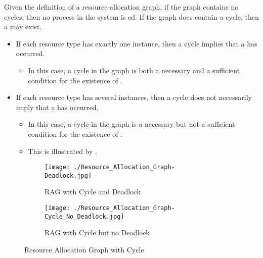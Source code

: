Given the definition of a resource-allocation graph, if the graph contains no cycles, then no process in the system is ed.
If the graph does contain a cycle, then a  may exist.
\begin{itemize}[noitemsep]
\item If each resource type has exactly one instance, then a cycle implies that a  has occurred.
  \begin{itemize}[noitemsep]
  \item In this case, a cycle in the graph is both a necessary and a sufficient condition for the existence of .
  \end{itemize}
\item If each resource type has several instances, then a cycle does not necessarily imply that a  has occurred.
  \begin{itemize}[noitemsep]
  \item In this case, a cycle in the graph is a necessary but not a sufficient condition for the existence of .
  \item This is illustrated by .
  \end{itemize}
\end{itemize}

\begin{figure}[h!tbp]
  \centering
  \begin{subfigure}[h!tbp]{0.48\linewidth}
    \centering
    \texttt{[image: ./Resource\_Allocation\_Graph-Deadlock.jpg]}
    \caption{RAG with Cycle and Deadlock}
    \label{subfig:Resource_Allocation_Graph-Cycle_Deadlock}
  \end{subfigure}
  \begin{subfigure}[h!tbp]{0.48\linewidth}
    \centering
    \texttt{[image: ./Resource\_Allocation\_Graph-Cycle\_No\_Deadlock.jpg]}
    \caption{RAG with Cycle but no Deadlock}
    \label{subfig:Resource_Allocation_Graph-Cycle_No_Deadlock}
  \end{subfigure}
  \caption{Resource Allocation Graph with Cycle}
  \label{fig:Resource_Allocation_Graph-Cycle}
\end{figure}

